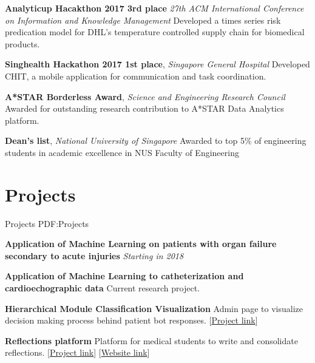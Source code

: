 \documentclass[letterpaper,10pt,oneside]{article}
\begin{document}
\begin{body}
\textbf{Analyticup Hacakthon 2017 3rd place}
\hfill{}
\GapNoBreak
\textit{27th ACM International Conference on Information and Knowledge Management}
\GapNoBreak
\BulletItem
Developed a times series risk predication model for DHL's temperature controlled supply chain for biomedical products.
\GapNoBreak

\textbf{Singhealth Hackathon 2017 1st place}, \textit{Singapore General Hospital}
\hfill{}
\BulletItem
Developed CHIT, a mobile application for communication and task coordination.
\GapNoBreak


\textbf{A*STAR Borderless Award}, \textit{Science and Engineering Research Council}
\hfill
{}
\BulletItem
Awarded for outstanding research contribution to A*STAR Data Analytics platform.
\GapNoBreak

\textbf{Dean's list}, \textit{National University of Singapore}
\hfill
{}
\BulletItem
Awarded to top 5\% of engineering students in academic excellence in NUS Faculty of Engineering
\GapNoBreak

\section
{Projects}
{Projects}
{PDF:Projects}

\textbf{Application of Machine Learning on patients with organ failure secondary to acute injuries}
\newline \textit{Starting in 2018}
\GapNoBreak

\textbf{Application of Machine Learning to catheterization and cardioechographic data}
\newline Current research project.
\GapNoBreak

\textbf{Hierarchical Module Classification Visualization}
\newline Admin page to visualize decision making process behind patient bot responses. [\href{https://github.com/llja0112/medbot-server-admin}{Project link}]
\GapNoBreak

\textbf{Reflections platform}
\newline Platform for medical students to write and consolidate reflections. [\href{https://github.com/llja0112/reflections}{Project link}] [\href{http://reflective.me}{Website link}]
\GapNoBreak


\end{body}
\end{document}
